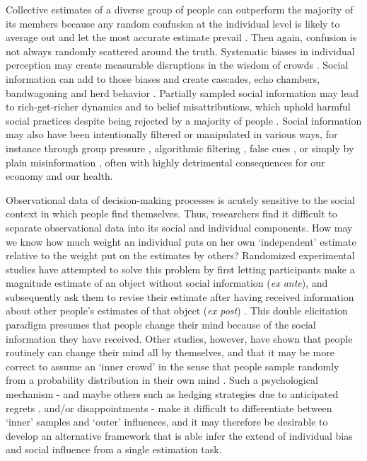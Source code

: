 \documentclass[9pt,a4paper,twocolumn,lineno]{article}
\begin{document}
Collective estimates of a diverse group of people can outperform the majority of its members because any random confusion at the individual level is likely to average out and let the most accurate estimate prevail \cite{galton1907vox, muth1961rational, surowiecki2005wisdom, hong2008some}. Then again, confusion is not always randomly scattered around the truth. Systematic biases in individual perception may create measurable disruptions in the wisdom of crowds \cite{izard2008calibrating, nash2014curious, kao2018counteracting}. Social information can add to those biases and create cascades, echo chambers, bandwagoning and herd behavior \cite{anderson1997information, bikhchandani1992theory, bakshy2015exposure, banerjee1992simple}. Partially sampled social information may lead to rich-get-richer dynamics \cite{barabasi1999emergence} and to belief misattributions, which uphold harmful social practices despite being rejected by a majority of people \cite{katz1931students, darley1968bystander, ross1977false, noelle1974spiral, lee2019homophily}. Social information may also have been intentionally filtered or manipulated in various ways, for instance through group pressure \cite{asch1951effects}, algorithmic filtering \cite{pariser2011filter}, false cues \cite{salganik2006experimental, muchnik2013social, hanson1996hits}, or simply by plain misinformation \cite{hendricks2018reality}, often with highly detrimental consequences for our economy and our health.

Observational data of decision-making processes is acutely sensitive to the social context in which people find themselves. Thus, researchers find it difficult to separate observational data into its social and individual components. How may we know how much weight an individual puts on her own ‘independent’ estimate relative to the weight put on the estimates by others? Randomized experimental studies have attempted to solve this problem by first letting participants make a magnitude estimate of an object without social information (\textit{ex ante}), and subsequently ask them to revise their estimate after having received information about other people’s estimates of that object (\textit{ex post}) \cite{becker2017network, jayles2017social, lorenz2011social, sniezek1995cueing, mavrodiev2013quantifying}. This double elicitation paradigm presumes that people change their mind because of the social information they have received. Other studies, however, have shown that people routinely can change their mind all by themselves, and that it may be more correct to assume an `inner crowd' in the sense that people sample randomly from a probability distribution in their own mind \cite{vul2008measuring, herzog2009wisdom, herzog2014harnessing}. Such a psychological mechanism - and maybe others such as hedging strategies due to anticipated regrets \cite{bell1982regret}, and/or disappointments \cite{loomes1986disappointment} - make it difficult to differentiate between `inner' samples and `outer' influences, and it may therefore be desirable to develop an alternative framework that is able infer the extend of individual bias and social influence from a single estimation task.
\end{document}
